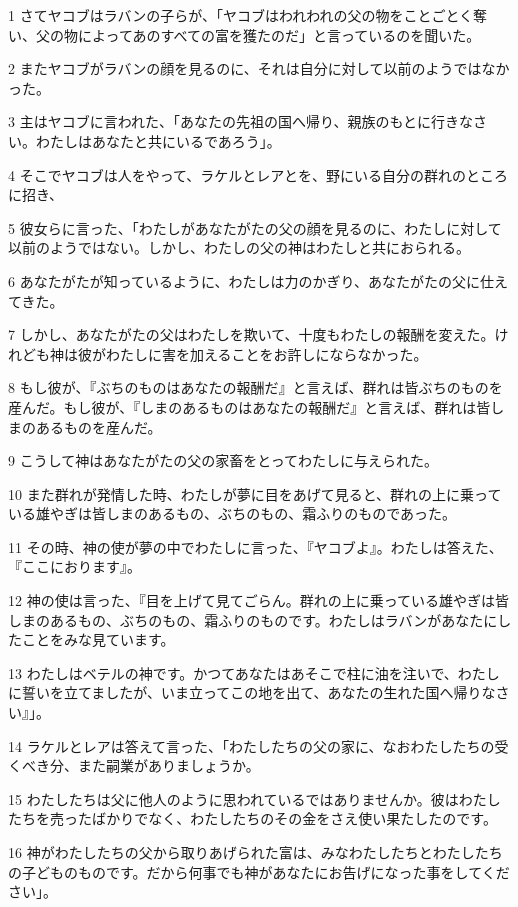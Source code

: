 \par 1 さてヤコブはラバンの子らが、「ヤコブはわれわれの父の物をことごとく奪い、父の物によってあのすべての富を獲たのだ」と言っているのを聞いた。
\par 2 またヤコブがラバンの顔を見るのに、それは自分に対して以前のようではなかった。
\par 3 主はヤコブに言われた、「あなたの先祖の国へ帰り、親族のもとに行きなさい。わたしはあなたと共にいるであろう」。
\par 4 そこでヤコブは人をやって、ラケルとレアとを、野にいる自分の群れのところに招き、
\par 5 彼女らに言った、「わたしがあなたがたの父の顔を見るのに、わたしに対して以前のようではない。しかし、わたしの父の神はわたしと共におられる。
\par 6 あなたがたが知っているように、わたしは力のかぎり、あなたがたの父に仕えてきた。
\par 7 しかし、あなたがたの父はわたしを欺いて、十度もわたしの報酬を変えた。けれども神は彼がわたしに害を加えることをお許しにならなかった。
\par 8 もし彼が、『ぶちのものはあなたの報酬だ』と言えば、群れは皆ぶちのものを産んだ。もし彼が、『しまのあるものはあなたの報酬だ』と言えば、群れは皆しまのあるものを産んだ。
\par 9 こうして神はあなたがたの父の家畜をとってわたしに与えられた。
\par 10 また群れが発情した時、わたしが夢に目をあげて見ると、群れの上に乗っている雄やぎは皆しまのあるもの、ぶちのもの、霜ふりのものであった。
\par 11 その時、神の使が夢の中でわたしに言った、『ヤコブよ』。わたしは答えた、『ここにおります』。
\par 12 神の使は言った、『目を上げて見てごらん。群れの上に乗っている雄やぎは皆しまのあるもの、ぶちのもの、霜ふりのものです。わたしはラバンがあなたにしたことをみな見ています。
\par 13 わたしはベテルの神です。かつてあなたはあそこで柱に油を注いで、わたしに誓いを立てましたが、いま立ってこの地を出て、あなたの生れた国へ帰りなさい』」。
\par 14 ラケルとレアは答えて言った、「わたしたちの父の家に、なおわたしたちの受くべき分、また嗣業がありましょうか。
\par 15 わたしたちは父に他人のように思われているではありませんか。彼はわたしたちを売ったばかりでなく、わたしたちのその金をさえ使い果たしたのです。
\par 16 神がわたしたちの父から取りあげられた富は、みなわたしたちとわたしたちの子どものものです。だから何事でも神があなたにお告げになった事をしてください」。
